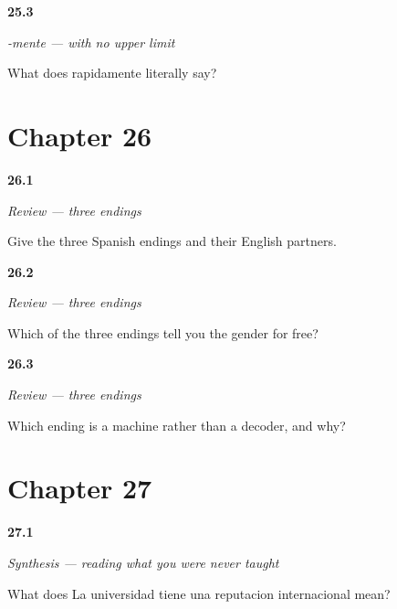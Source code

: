 \noindent\begin{minipage}[t]{\linewidth}
\raggedright
\hypertarget{review-ES-C56-mente-literal}{\textbf{25.3}} \emph{-mente — with no upper limit}\par
\small What does rapidamente literally say?
\end{minipage}\par\medskip

\section*{Chapter 26}

\noindent\begin{minipage}[t]{\linewidth}
\raggedright
\hypertarget{review-ES-C56-repaso-amigos-three}{\textbf{26.1}} \emph{Review — three endings}\par
\small Give the three Spanish endings and their English partners.
\end{minipage}\par\medskip

\noindent\begin{minipage}[t]{\linewidth}
\raggedright
\hypertarget{review-ES-C56-repaso-amigos-gender}{\textbf{26.2}} \emph{Review — three endings}\par
\small Which of the three endings tell you the gender for free?
\end{minipage}\par\medskip

\noindent\begin{minipage}[t]{\linewidth}
\raggedright
\hypertarget{review-ES-C56-repaso-amigos-kinds}{\textbf{26.3}} \emph{Review — three endings}\par
\small Which ending is a machine rather than a decoder, and why?
\end{minipage}\par\medskip

\section*{Chapter 27}

\noindent\begin{minipage}[t]{\linewidth}
\raggedright
\hypertarget{review-ES-C56-sintesis-leer-read}{\textbf{27.1}} \emph{Synthesis — reading what you were never taught}\par
\small What does La universidad tiene una reputacion internacional mean?
\end{minipage}\par\medskip

